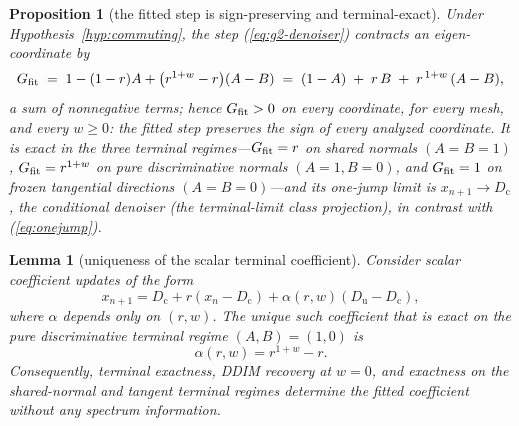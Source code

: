 \documentclass{article} %
\def\eqref#1{equation~\ref{#1}}
\theoremstyle{plain}
\newtheorem{proposition}{Proposition}
\newtheorem{lemma}{Lemma}
\theoremstyle{definition}
\theoremstyle{remark}
\providecommand{\Dc}{D_{\mathrm{c}}}
\providecommand{\Du}{D_{\mathrm{u}}}
\def\eqref#1{(\ref{#1})}
\newif\ifarxiv
\begin{document}
\begin{proposition}[the fitted step is sign-preserving and terminal-exact]\label{prop:gfit-sign}
Under Hypothesis~\ref{hyp:commuting}, the step \eqref{eq:g2-denoiser}
contracts an eigen-coordinate by
\begin{equation}\label{eq:gfit-decomp}
  G_{\rm fit}
  \;=\; 1 - (1-r)A + \bigl(r^{1+w}-r\bigr)(A-B)
  \;=\; (1-A) \;+\; r\,B \;+\; r^{\,1+w}\,(A-B) ,
\end{equation}
a sum of nonnegative terms; hence $G_{\rm fit} > 0$ on every coordinate,
for every mesh, and every $w \ge 0$: the fitted step preserves the sign of
every analyzed coordinate.
It is exact in the three terminal regimes---$G_{\rm fit} = r$ on
shared normals $(A=B=1)$, $G_{\rm fit} = r^{1+w}$ on pure discriminative
normals $(A=1, B=0)$, and $G_{\rm fit} = 1$ on frozen tangential directions
$(A=B=0)$---and its one-jump limit is $x_{n+1} \to \Dc$, the conditional
denoiser (the terminal-limit class projection), in contrast with
\eqref{eq:onejump}.
\end{proposition}

\newcommand{\ProofGFitSign}{%
On an eigen-coordinate, $\Dc = (1-A)\xi$, $x-\Dc = A\xi$, and $\Du - \Dc =
(A-B)\xi$; substituting into \eqref{eq:g2-denoiser} gives the first
expression in \eqref{eq:gfit-decomp}, and regrouping $1 - A + rA - r(A-B) +
r^{1+w}(A-B)$ gives the second. Nonnegativity of each term is
$0 \le B \le A \le 1$ and $0 < r < 1$. The regime values and the $r \to 0$
limit are read off termwise.
}
\ifarxiv\begin{proof}\ProofGFitSign\end{proof}\fi

\begin{lemma}[uniqueness of the scalar terminal coefficient]\label{lem:g2-unique}
Consider scalar coefficient updates of the form
\[
  x_{n+1} = \Dc + r(x_n-\Dc) + \alpha(r,w)(\Du-\Dc),
\]
where $\alpha$ depends only on $(r,w)$.  The unique such coefficient that is
exact on the pure discriminative terminal regime $(A,B)=(1,0)$ is
\[
  \alpha(r,w) = r^{1+w}-r .
\]
Consequently, terminal exactness, DDIM recovery at $w=0$, and exactness on
the shared-normal and tangent terminal regimes determine the fitted coefficient
without any spectrum information.
\end{lemma}

\newcommand{\ProofGTwoUnique}{%
On shared normals $(A,B)=(1,1)$ one has $\Du-\Dc=0$, so every scalar
coefficient gives the DDIM factor $r$.  On tangent directions
$(A,B)=(0,0)$, both denoisers equal the state and every coefficient gives
factor $1$.  On a pure discriminative normal $(A,B)=(1,0)$, the factor of
the scalar update is $r+\alpha(r,w)$.  Exactness requires
$r+\alpha(r,w)=r^{1+w}$, hence the displayed coefficient, uniquely.
}
\ifarxiv\begin{proof}\ProofGTwoUnique\end{proof}\fi
\end{document}
